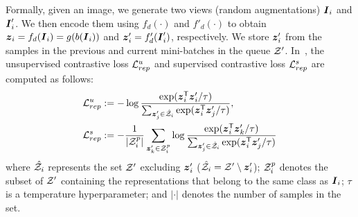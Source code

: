 



Formally, given an image, we generate two views (random augmentations) $\boldsymbol{I}_i$ and $\boldsymbol{I}'_i$. We then encode them using $f_d(\cdot)$ and $f'_d(\cdot)$ to obtain $\boldsymbol{z}_i = f_d(\boldsymbol{I}_i) = g(b(\boldsymbol{I}_i))$ and $\boldsymbol{z}'_i = f'_d(\boldsymbol{I}'_i)$, respectively. We store $\boldsymbol{z}'_i$ from the samples in the previous and current mini-batches in the queue $\mathcal{Z}'$. In~\cite{vaze2022generalized}, the unsupervised contrastive loss $\mathcal{L}^u_{rep}$ and supervised contrastive loss $\mathcal{L}^s_{rep}$ are computed as follows:
\begin{equation}
\begin{split}
& \mathcal{L}^u_{rep}:= -\log \frac{\exp(\boldsymbol{z}_i^\mathsf{T} \boldsymbol{z}'_i/\tau)}{\sum_{\boldsymbol{z}'_j \in \hat{\mathcal{Z}}_i } \exp(\boldsymbol{z}_i^\mathsf{T} \boldsymbol{z}'_j/\tau)}, \\
& \mathcal{L}^s_{rep} := - \frac{1}{|\mathcal{Z}^p_i|}\sum_{\boldsymbol{z}'_k \in \mathcal{Z}^p_i} \log \frac{\exp(\boldsymbol{z}_i^\mathsf{T} \boldsymbol{z}'_k/\tau)}{\sum_{\boldsymbol{z}'_j \in \hat{\mathcal{Z}}_i } \exp(\boldsymbol{z}_i^\mathsf{T} \boldsymbol{z}'_j/\tau)}
\label{eqn:cont_loss_prelim}
\end{split}
\end{equation}
where $\hat{\mathcal{Z}}_i$ represents the set $\mathcal{Z}'$ excluding $\boldsymbol{z}'_i$ (\ie $\hat{\mathcal{Z}}_i = \mathcal{Z}' \setminus \boldsymbol{z}'_i$); $\mathcal{Z}^p_i$ denotes the subset of $\mathcal{Z}'$ containing the representations that belong to the same class as $\boldsymbol{I}_i$; $\tau$ is a temperature hyperparameter; and $|\cdot|$ denotes the number of samples in the set.





